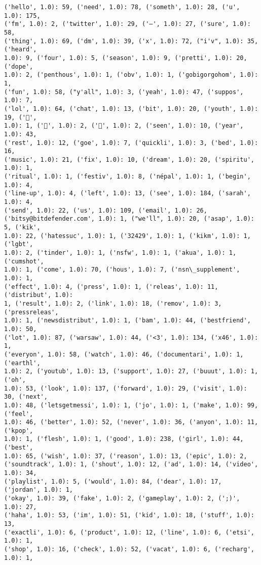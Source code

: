 \documentclass[11pt]{article}
\begin{document}
\begin{Verbatim}[commandchars=\\\{\}]
('hello', 1.0): 59, ('need', 1.0): 78, ('someth', 1.0): 28, ('u', 1.0): 175,
('fm', 1.0): 2, ('twitter', 1.0): 29, ('—', 1.0): 27, ('sure', 1.0): 58,
('thing', 1.0): 69, ('dm', 1.0): 39, ('x', 1.0): 72, ("i'v", 1.0): 35, ('heard',
1.0): 9, ('four', 1.0): 5, ('season', 1.0): 9, ('pretti', 1.0): 20, ('dope',
1.0): 2, ('penthous', 1.0): 1, ('obv', 1.0): 1, ('gobigorgohom', 1.0): 1,
('fun', 1.0): 58, ("y'all", 1.0): 3, ('yeah', 1.0): 47, ('suppos', 1.0): 7,
('lol', 1.0): 64, ('chat', 1.0): 13, ('bit', 1.0): 20, ('youth', 1.0): 19, ('💅',
1.0): 1, ('🏽', 1.0): 2, ('💋', 1.0): 2, ('seen', 1.0): 10, ('year', 1.0): 43,
('rest', 1.0): 12, ('goe', 1.0): 7, ('quickli', 1.0): 3, ('bed', 1.0): 16,
('music', 1.0): 21, ('fix', 1.0): 10, ('dream', 1.0): 20, ('spiritu', 1.0): 1,
('ritual', 1.0): 1, ('festiv', 1.0): 8, ('népal', 1.0): 1, ('begin', 1.0): 4,
('line-up', 1.0): 4, ('left', 1.0): 13, ('see', 1.0): 184, ('sarah', 1.0): 4,
('send', 1.0): 22, ('us', 1.0): 109, ('email', 1.0): 26,
('bitsy@bitdefender.com', 1.0): 1, ("we'll", 1.0): 20, ('asap', 1.0): 5, ('kik',
1.0): 22, ('hatessuc', 1.0): 1, ('32429', 1.0): 1, ('kikm', 1.0): 1, ('lgbt',
1.0): 2, ('tinder', 1.0): 1, ('nsfw', 1.0): 1, ('akua', 1.0): 1, ('cumshot',
1.0): 1, ('come', 1.0): 70, ('hous', 1.0): 7, ('nsn\_supplement', 1.0): 1,
('effect', 1.0): 4, ('press', 1.0): 1, ('releas', 1.0): 11, ('distribut', 1.0):
1, ('result', 1.0): 2, ('link', 1.0): 18, ('remov', 1.0): 3, ('pressreleas',
1.0): 1, ('newsdistribut', 1.0): 1, ('bam', 1.0): 44, ('bestfriend', 1.0): 50,
('lot', 1.0): 87, ('warsaw', 1.0): 44, ('<3', 1.0): 134, ('x46', 1.0): 1,
('everyon', 1.0): 58, ('watch', 1.0): 46, ('documentari', 1.0): 1, ('earthl',
1.0): 2, ('youtub', 1.0): 13, ('support', 1.0): 27, ('buuut', 1.0): 1, ('oh',
1.0): 53, ('look', 1.0): 137, ('forward', 1.0): 29, ('visit', 1.0): 30, ('next',
1.0): 48, ('letsgetmessi', 1.0): 1, ('jo', 1.0): 1, ('make', 1.0): 99, ('feel',
1.0): 46, ('better', 1.0): 52, ('never', 1.0): 36, ('anyon', 1.0): 11, ('kpop',
1.0): 1, ('flesh', 1.0): 1, ('good', 1.0): 238, ('girl', 1.0): 44, ('best',
1.0): 65, ('wish', 1.0): 37, ('reason', 1.0): 13, ('epic', 1.0): 2,
('soundtrack', 1.0): 1, ('shout', 1.0): 12, ('ad', 1.0): 14, ('video', 1.0): 34,
('playlist', 1.0): 5, ('would', 1.0): 84, ('dear', 1.0): 17, ('jordan', 1.0): 1,
('okay', 1.0): 39, ('fake', 1.0): 2, ('gameplay', 1.0): 2, (';)', 1.0): 27,
('haha', 1.0): 53, ('im', 1.0): 51, ('kid', 1.0): 18, ('stuff', 1.0): 13,
('exactli', 1.0): 6, ('product', 1.0): 12, ('line', 1.0): 6, ('etsi', 1.0): 1,
('shop', 1.0): 16, ('check', 1.0): 52, ('vacat', 1.0): 6, ('recharg', 1.0): 1,

\end{Verbatim}
\end{document}
